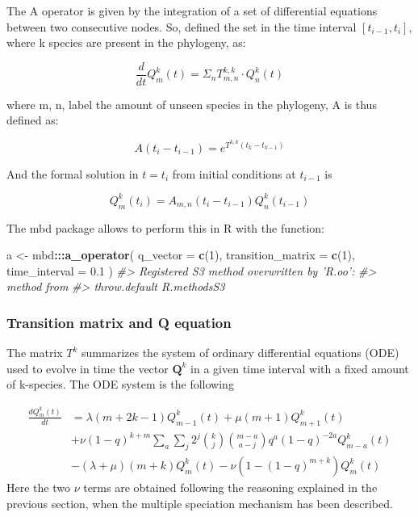 \documentclass[]{article}
\newenvironment{Shaded}{\begin{snugshade}}{\end{snugshade}}
\newcommand{\CommentTok}[1]{\textcolor[rgb]{0.56,0.35,0.01}{\textit{#1}}}
\newcommand{\DataTypeTok}[1]{\textcolor[rgb]{0.13,0.29,0.53}{#1}}
\newcommand{\DecValTok}[1]{\textcolor[rgb]{0.00,0.00,0.81}{#1}}
\newcommand{\FloatTok}[1]{\textcolor[rgb]{0.00,0.00,0.81}{#1}}
\newcommand{\KeywordTok}[1]{\textcolor[rgb]{0.13,0.29,0.53}{\textbf{#1}}}
\newcommand{\NormalTok}[1]{#1}
\newcommand{\OperatorTok}[1]{\textcolor[rgb]{0.81,0.36,0.00}{\textbf{#1}}}
\newcommand{\StringTok}[1]{\textcolor[rgb]{0.31,0.60,0.02}{#1}}
\begin{document}
The A operator is given by the integration of a set of differential equations
between two consecutive nodes. So, defined the set in the time interval
\([t_{i-1}, t_i]\), where k species are present in the phylogeny, as:

\[
\frac{d}{dt}Q^k_m(t) = \Sigma_n T^{k,k}_{m,n} \cdot Q^k_n(t)
\]

where m, n, label the amount of unseen species in the phylogeny,
A is thus defined as:

\[
A(t_i - t_{i-1}) = e^{T^{k,k}(t_k - t_{k-1})}
\]

And the formal solution in \(t = t_{i}\) from initial conditions at \(t_{i - 1}\) is

\[
Q^k_m(t_{i}) = A_{m,n}(t_i - t_{i-1}) Q^k_n(t_{i - 1})
\]

The mbd package allows to perform this in R with the function:

\begin{Shaded}
\begin{Highlighting}[]
\NormalTok{a <-}\StringTok{ }\NormalTok{mbd}\OperatorTok{:::}\KeywordTok{a_operator}\NormalTok{(}
  \DataTypeTok{q_vector =} \KeywordTok{c}\NormalTok{(}\DecValTok{1}\NormalTok{),}
  \DataTypeTok{transition_matrix =} \KeywordTok{c}\NormalTok{(}\DecValTok{1}\NormalTok{),}
  \DataTypeTok{time_interval =} \FloatTok{0.1}
\NormalTok{)}
\CommentTok{#> Registered S3 method overwritten by 'R.oo':}
\CommentTok{#>   method        from       }
\CommentTok{#>   throw.default R.methodsS3}
\end{Highlighting}
\end{Shaded}

\hypertarget{transition-matrix-and-q-equation}{%
\subsubsection{Transition matrix and Q equation}\label{transition-matrix-and-q-equation}}

The matrix \(T^k\) summarizes the system of ordinary differential equations (ODE)
used to evolve in time the vector \(\mathbf{Q}^k\) in a given time interval with
a fixed amount of k-species. The ODE system is the following

\[
\begin{aligned}
\frac{d Q^k_m(t)}{dt} & = 
\lambda (m + 2k - 1) Q^k_{m - 1}(t) +
\mu (m + 1) Q^k_{m + 1}(t) \\
& + \nu (1 - q) ^ {k + m} 
\sum_{a}
\sum_{j} 2 ^ {j} \binom{k}{j} \binom{m - a}{a - j} q ^ {a} (1 - q) ^ {- 2a}
Q^k_{m - a}(t) \\
& - (\lambda + \mu) (m + k) Q^k_{m}(t)
- \nu (1 - (1 - q) ^ {m + k}) Q^k_{m}(t)
\end{aligned}
\]
Here the two \(\nu\) terms are obtained following the reasoning explained in the
previous section, when the multiple speciation mechanism has been described.
\end{document}
